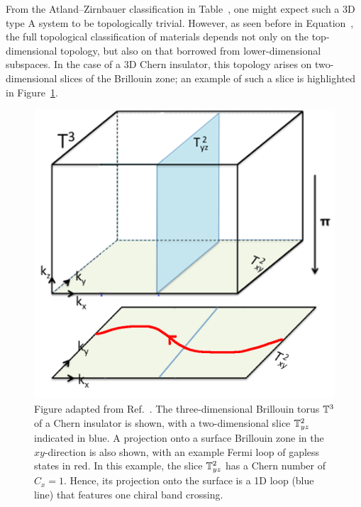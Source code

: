 From the Atland--Zirnbauer classification in Table~\red{[reference]}, %
one might expect such a 3D type A system to be topologically trivial. However, as seen before in Equation~, %
the full topological classification of materials depends not only on the top-dimensional topology, but also on that borrowed from lower-dimensional subspaces. In the case of a 3D Chern insulator, this topology arises on two-dimensional slices of the Brillouin zone; an example of such a slice is highlighted in Figure~\ref{fig:3D_Chern_insulator}.
\begin{figure}[htb!]
	\centering
	\includegraphics[width=.5\linewidth]{Images/3D_Chern_insulator}
	\caption{Figure adapted from Ref.~\cite{Mathai_math-review}. The three-dimensional Brillouin torus $\mathbb{T}^3$ of a Chern insulator is shown, with a two-dimensional slice $\mathbb{T}_{yz}^2$ indicated in blue. A projection onto a surface Brillouin zone in the $xy$-direction is also shown, with an example Fermi loop of gapless states in red. In this example, the slice $\mathbb{T}_{yz}^2$ has a Chern number of $C_{x} = 1$. Hence, its projection onto the surface is a 1D loop (blue line) that features one chiral band crossing.}
	\label{fig:3D_Chern_insulator}
\end{figure}

